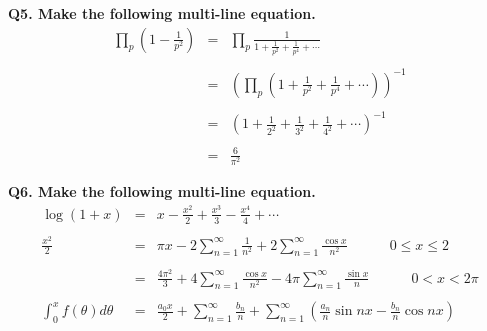 \documentclass{article}
\begin{document}
	\noindent \textbf{Q5. Make the following multi-line equation.}
	\begin{eqnarray*}
		\prod_p \left(1-\frac{1}{p^2}\right) & = & \prod_p \frac{1}{1+\frac{1}{p^2}+\frac{1}{p^4}+\cdots}\\\\
		& = & \left(\prod_p \left( 1+\frac{1}{p^2}+\frac{1}{p^4}+\cdots\right) \right)^{-1}\\\\
		& = & \left( 1+\frac{1}{2^2}+\frac{1}{3^2}+\frac{1}{4^2}+\cdots\right)^{-1}\\\\
		& = & \frac{6}{\pi^2}
	\end{eqnarray*}
	
	\noindent \textbf{Q6. Make the following multi-line equation.}
	\begin{eqnarray*}
		\log(1+x) & = & x - \frac{x^2}{2} + \frac{x^3}{3} - \frac{x^4}{4} + \cdots\\\\
		\frac{x^2}{2} & = & \pi x - 2\sum_{n=1}^{\infty} \frac{1}{n^2} +2\sum_{n=1}^{\infty} \frac{\cos x}{n^2} \quad\quad\quad 0\leq x\leq2\\\\
		& = & \frac{4\pi^2}{3}+4\sum_{n=1}^{\infty} \frac{\cos x}{n^2}-4\pi \sum_{n=1}^{\infty} \frac{\sin x}{n} \quad\quad\quad 0<x<2\pi\\\\
		\int_{0}^{x} f(\theta) d\theta & = & \frac{a_0x}{2}+\sum_{n=1}^{\infty} \frac{b_n}{n}+\sum_{n=1}^{\infty} \left( \frac{a_n}{n} \sin nx -\frac{b_n}{n}\cos nx \right)
	\end{eqnarray*}
	
\end{document}
